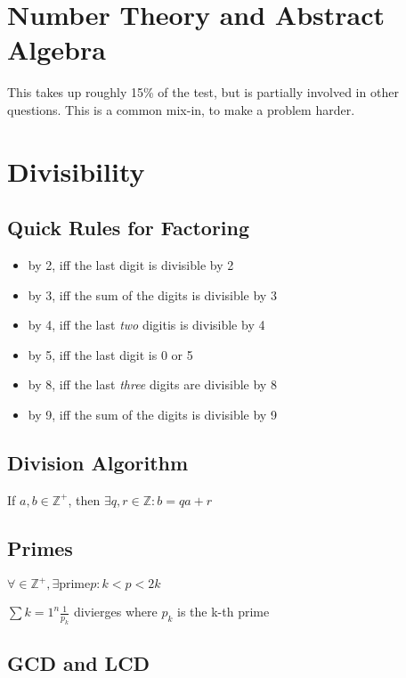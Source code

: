 \documentclass{article}
\begin{document}
\section{Number Theory and Abstract Algebra}

This takes up roughly 15\% of the test, but is partially involved in other
questions. This is a common mix-in, to make a problem harder.

\section{Divisibility}

\subsection{Quick Rules for Factoring}

\begin{itemize}
  \item by 2, iff the last digit is divisible by 2
  \item by 3, iff the sum of the digits is divisible by 3
  \item by 4, iff the last \emph{two} digitis is divisible by 4
  \item by 5, iff the last digit is 0 or 5
  \item by 8, iff the last \emph{three} digits are divisible by 8
  \item by 9, iff the sum of the digits is divisible by 9
\end{itemize}

\subsection{Division Algorithm}

If $a, b \in \mathbb{Z}^+$, then $\exists q, r \in \mathbb{Z} : b = qa + r$


\subsection{Primes}

$ \forall \in \mathbb{Z}^+, \exists \text{prime} p : k < p < 2k $

$ \sum{k=1}^n{\frac{1}{p_k}} $ divierges where $p_k$ is the k-th prime

\subsection{GCD and LCD}
\end{document}
